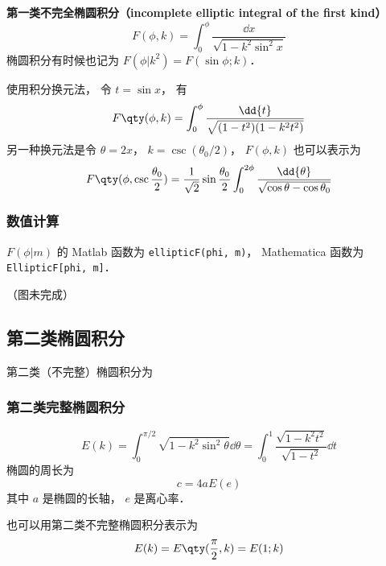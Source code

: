 

\textbf{第一类不完全椭圆积分（incomplete elliptic integral of the first kind）}
\begin{equation}\label{EliInt_eq1}
F(\phi, k) = \int_0^\phi \frac{\dd{x}}{\sqrt{1 - k^2\sin^2 x}}
\end{equation}
椭圆积分有时候也记为 $F(\phi | k^2) = F(\sin\phi ; k)$．

使用积分换元法， 令 $t = \sin x$， 有
\begin{equation}
F\qty(\phi, k) = \int_0^\phi \frac{\dd{t}}{\sqrt{(1 - t^2)(1 - k^2 t^2)}}
\end{equation}
另一种换元法是令 $\theta = 2x$， $k = \csc(\theta_0/2)$， $F(\phi, k)$ 也可以表示为
\begin{equation}\label{EliInt_eq2}
F\qty(\phi, \csc\frac{\theta_0}{2}) = \frac{1}{\sqrt{2}} \sin\frac{\theta_0}{2} \int_0^{2\phi} \frac{\dd{\theta}}{\sqrt{\cos\theta - \cos\theta_0}}
\end{equation}

\subsubsection{数值计算}
$F(\phi | m)$ 的 Matlab 函数为 \verb|ellipticF(phi, m)|， %
Mathematica 函数为 \verb|EllipticF[phi, m]|．

（图未完成）

\subsection{第二类椭圆积分}
第二类（不完整）椭圆积分为


\subsubsection{第二类完整椭圆积分}

\begin{equation}
E(k) = \int_0^{\pi/2} \sqrt{1 - k^2\sin^2\theta} \dd{\theta} = \int_0^1 \frac{\sqrt{1 - k^2 t^2}}{\sqrt{1 - t^2}} \dd{t}
\end{equation}
椭圆的周长为
\begin{equation}
c = 4aE(e)
\end{equation}
其中 $a$ 是椭圆的长轴， $e$ 是离心率．

也可以用第二类不完整椭圆积分表示为
\begin{equation}
E(k) = E\qty(\frac{\pi}{2}, k) = E(1; k)
\end{equation}
